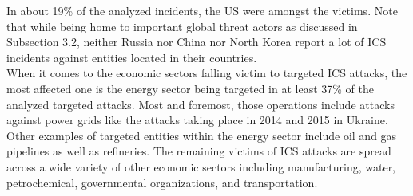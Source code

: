 \documentclass[runningheads]{llncs}
\begin{document}
In about 19\% of the analyzed incidents, the US were amongst the victims.
Note that while being home to important global threat actors as discussed in Subsection 3.2, neither Russia nor China nor North Korea report a lot of ICS incidents against entities located in their countries.
\\
When it comes to the economic sectors falling victim to targeted ICS attacks, the most affected one is the energy sector being targeted in at least 37\% of the analyzed targeted attacks.
Most and foremost, those operations include attacks against power grids like the attacks taking place in 2014 and 2015 in Ukraine.
Other examples of targeted entities within the energy sector include oil and gas pipelines as well as refineries.
The remaining victims of ICS attacks are spread across a wide variety of other economic sectors including manufacturing, water, petrochemical, governmental organizations, and transportation.
\end{document}
